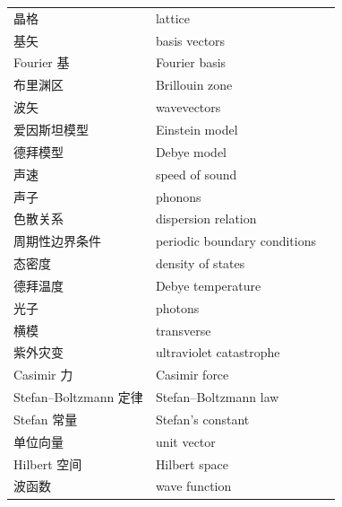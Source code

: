 \begin{xltabular}{\textwidth}{@{}l l c@{}}
  晶格 & {\glossaryfont lattice} & \pageref{term:6.lattice} \\
  基矢 & {\glossaryfont basis vectors} & \pageref{term:6.basis-vectors} \\
  Fourier 基 & {\glossaryfont Fourier basis} & \pageref{term:6.fourier-basis} \\
  布里渊区 & {\glossaryfont Brillouin zone} & \pageref{term:6.brillouin-zone} \\
  波矢 & {\glossaryfont wavevectors} & \pageref{term:6.wavevector} \\
  爱因斯坦模型 & {\glossaryfont Einstein model} & \pageref{term:6.einstein-model} \\
  德拜模型 & {\glossaryfont Debye model} & \pageref{term:6.debye-model} \\
  声速 & {\glossaryfont speed of sound} & \pageref{term:6.speed-of-sound} \\
  声子 & {\glossaryfont phonons} & \pageref{term:6.phonons} \\
  色散关系 & {\glossaryfont dispersion relation} & \pageref{term:6.dispersion-relation} \\
  周期性边界条件 & {\glossaryfont periodic boundary conditions} & \pageref{term:6.periodic-bc} \\
  态密度 & {\glossaryfont density of states} & \pageref{term:6.density-of-states} \\
  德拜温度 & {\glossaryfont Debye temperature} & \pageref{term:6.debye-temperature} \\
  光子 & {\glossaryfont photons} & \pageref{term:6.photons} \\
  横模 & {\glossaryfont transverse} & \pageref{term:6.transverse} \\
  紫外灾变 & {\glossaryfont ultraviolet catastrophe} & \pageref{term:6.ultraviolet-catastrophe} \\
  Casimir 力 & {\glossaryfont Casimir force} & \pageref{term:6.casimir-force} \\
  Stefan--Boltzmann 定律 & {\glossaryfont Stefan--Boltzmann law} & \pageref{term:6.stefan-boltzmann-law} \\
  Stefan 常量 & {\glossaryfont Stefan's constant} & \pageref{term:6.stefan-constant} \\
  单位向量 & {\glossaryfont unit vector} & \pageref{term:6.unit-vector} \\
  Hilbert 空间 & {\glossaryfont Hilbert space} & \pageref{term:6.hilbert-space} \\
  波函数 & {\glossaryfont wave function} & \pageref{term:6.wave-function} \\

\end{xltabular}
